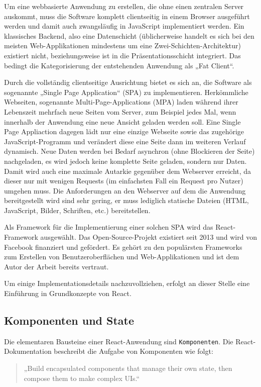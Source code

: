 Um eine webbasierte Anwendung zu erstellen, die ohne einen zentralen Server auskommt, muss die Software komplett clientseitig in einem Browser ausgeführt werden und damit auch zwangsläufig in JavaScript implementiert werden. Ein klassisches Backend, also eine Datenschicht (üblicherweise handelt es sich bei den meisten Web-Applikationen mindestens um eine Zwei-Schichten-Architektur) existiert nicht, beziehungsweise ist in die Präsentationsschicht integriert. Das bedingt die Kategorisierung der entstehenden Anwendung als „Fat Client“.

Durch die vollständig clientseitige Ausrichtung bietet es sich an, die Software als sogenannte „Single Page Application“ (SPA) zu implementieren. Herkömmliche Webseiten, sogenannte Multi-Page-Applications (MPA) laden während ihrer Lebenszeit mehrfach neue Seiten vom Server, zum Beispiel jedes Mal, wenn innerhalb der Anwendung eine neue Ansicht geladen werden soll. Eine Single Page Appliaction dagegen lädt nur eine einzige Webseite sowie das zugehörige JavaScript-Programm und verändert diese eine Seite dann im weiteren Verlauf dynamisch. Neue Daten werden bei Bedarf asynchron (ohne Blockieren der Seite) nachgeladen, es wird jedoch keine komplette Seite geladen, sondern nur Daten. Damit wird auch eine maximale Autarkie gegenüber dem Webserver erreicht, da dieser nur mit wenigen Requests (im einfachsten Fall ein Request pro Nutzer) umgehen muss. Die Anforderungen an den Webserver auf dem die Anwendung bereitgestellt wird sind sehr gering, er muss lediglich statische Dateien (HTML, JavaScript, Bilder, Schriften, etc.) bereitstellen.

Als Framework für die Implementierung einer solchen SPA wird das React-Framework\cite{web:react} ausgewählt. Das Open-Source-Projekt existiert seit 2013 und wird von Facebook finanziert und gefördert. Es gehört zu den populärsten Frameworks zum Erstellen von Benutzeroberflächen und Web-Applikationen\cite{web:stackoverflow_umfrage} und ist dem Autor der Arbeit bereits vertraut.

Um einige Implementationsdetails nachzuvollziehen, erfolgt an dieser Stelle eine  Einführung in Grundkonzepte von React.

\subsection{Komponenten und State}
Die elementaren Bausteine einer React-Anwendung sind \texttt{Komponenten}. Die React-Dokumentation beschreibt die Aufgabe von Komponenten wie folgt\cite{web:react}:
\begin{quotation}
„Build encapsulated components that manage their own state, then compose them to make complex UIs.“
\end{quotation}

